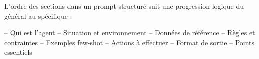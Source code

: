 \begin{Methode}
    L'ordre des sections dans un prompt structuré suit une progression logique du général au spécifique :
    
    \begin{tcbenumerate}[2]
        \tcbitem {} -- Qui est l'agent
        \tcbitem {} -- Situation et environnement  
        \tcbitem {} -- Données de référence
        \tcbitem {} -- Règles et contraintes
        \tcbitem {} -- Exemples few-shot
        \tcbitem {} -- Actions à effectuer
        \tcbitem {} -- Format de sortie
        \tcbitem {} -- Points essentiels
    \end{tcbenumerate}
\end{Methode}

